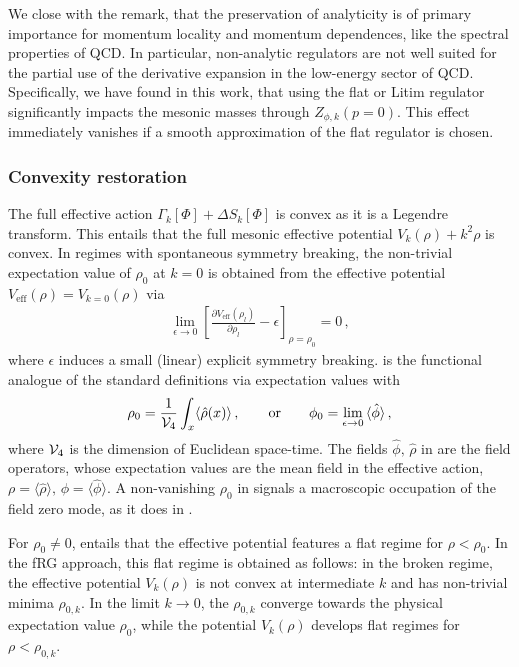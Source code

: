 \documentclass[aps,twocolumn,prd,superscriptaddress]{revtex4-2}
\begin{document}
We close with the remark, that the preservation of analyticity is of primary importance for momentum locality and momentum dependences, like the spectral properties of QCD. In particular, non-analytic regulators are not well suited for the partial use of the derivative expansion in the low-energy sector of QCD. Specifically, we have found in this work, that using the flat or Litim regulator significantly impacts the mesonic masses through $Z_{\phi,k}(p=0)$. This effect immediately vanishes if a smooth approximation of the flat regulator is chosen.


\subsubsection{Convexity restoration}
\label{sec:Convexity} 

The full effective action $\Gamma_k[\Phi]+\Delta S_k[\Phi]$ is convex as it is a Legendre transform. This entails that the full mesonic effective potential $V_{k}(\rho) + k^2 \rho$ is convex. In regimes with spontaneous symmetry breaking, the non-trivial expectation value of $\rho_0$ at $k=0$ is obtained from the effective potential $V_\textrm{eff}(\rho) = V_{k=0}(\rho)$ via 
%
\begin{align} 
\lim_{\epsilon\to 0} \left[ \frac{\partial V_\textrm{eff}(\rho_l)}{\partial {\rho_l}} - \epsilon \right]_{\rho= \rho_0}=0 \,,
\label{eq:EoMSpontSym}
\end{align}
%
where $\epsilon$ induces a small (linear) explicit symmetry breaking. 
 is the functional analogue of the standard definitions via expectation values with 
%
\begin{align}
	\rho_0 = \frac{1}{{\cal V}_4} \int_x \langle \hat \rho(x)\rangle \,,\qquad \textrm{or} \qquad \phi_0 =\lim_{\epsilon\to 0} \, \langle \hat\phi\rangle\,,  
	\label{eq:EoMExpt}
\end{align} 
%
where ${\cal V}_4$ is the dimension of Euclidean space-time. The fields $\hat\phi,\, \hat \rho$ in  are the field operators, whose expectation values are the mean field in the effective action, $\rho = \langle \hat\rho\rangle ,\,\phi= \langle \hat \phi\rangle$. A non-vanishing $\rho_0$ in  signals a macroscopic occupation of the field zero mode, as it does in . 

For $\rho_0\neq 0$,  entails that the effective potential features a flat regime for $\rho<\rho_0$. In the fRG approach, this flat regime is obtained as follows: in the broken regime, the effective potential $V_k(\rho)$ is not convex at intermediate $k$ and has non-trivial minima $\rho_{0,k}$. 
In the limit $k\to0$, the $\rho_{0,k}$ converge towards the physical expectation value $\rho_0$, while the potential $V_k(\rho)$ develops flat regimes for $\rho< \rho_{0,k}$. 
\end{document}
